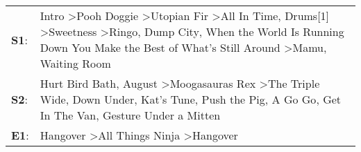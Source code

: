 \begin{supertabular}{p{0.03\textwidth}p{0.92\textwidth}}
 \textbf{S1}:  &  Intro\textsuperscript{} \textgreater \enspace Pooh Doggie\textsuperscript{} \textgreater \enspace Utopian Fir\textsuperscript{} \textgreater \enspace All In Time\textsuperscript{}, \enspace Drums[1]\textsuperscript{} \textgreater \enspace Sweetness\textsuperscript{} \textgreater \enspace Ringo\textsuperscript{}, \enspace Dump City\textsuperscript{}, \enspace When the World Is Running Down You Make the Best of What's Still Around\textsuperscript{} \textgreater \enspace Mamu\textsuperscript{}, \enspace Waiting Room\textsuperscript{}  \enspace  \\
 \textbf{S2}:  &                                                                                                              Hurt Bird Bath\textsuperscript{}, \enspace August\textsuperscript{} \textgreater \enspace Moogasauras Rex\textsuperscript{} \textgreater \enspace The Triple Wide\textsuperscript{}, \enspace Down Under\textsuperscript{}, \enspace Kat's Tune\textsuperscript{}, \enspace Push the Pig\textsuperscript{}, \enspace A Go Go\textsuperscript{}, \enspace Get In The Van\textsuperscript{}, \enspace Gesture Under a Mitten\textsuperscript{}  \enspace  \\
 \textbf{E1}:  &                                                                                                                                                                                                                                                                                                                                                                                                                      Hangover\textsuperscript{} \textgreater \enspace All Things Ninja\textsuperscript{} \textgreater \enspace Hangover\textsuperscript{}  \enspace  \\
\end{supertabular}
